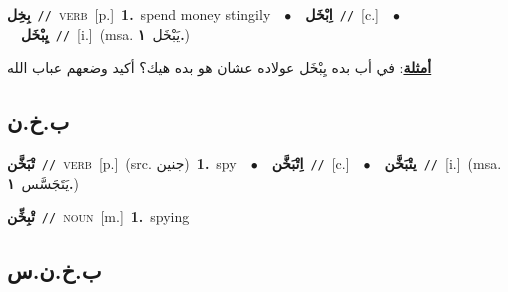 \documentclass[10pt,a4paper,twoside]{article} %
\begin{document}
\begin{multicols}{2}
{\setlength\topsep{0pt}\textbf{\foreignlanguage{arabic}{بِخِل}}\ {\color{gray}\texttt{//}\color{black}}\ \textsc{verb}\ [p.]\ \textbf{1.}~spend money stingily\ \ $\bullet$\ \ \setlength\topsep{0pt}\textbf{\foreignlanguage{arabic}{اِبْخَل}}\ {\color{gray}\texttt{//}\color{black}}\ [c.]\ \ $\bullet$\ \ \setlength\topsep{0pt}\textbf{\foreignlanguage{arabic}{يِبْخَل}}\ {\color{gray}\texttt{//}\color{black}}\ [i.]\ \color{gray}(msa. \foreignlanguage{arabic}{يَبْخَل}~\foreignlanguage{arabic}{\textbf{١.}})\color{black}\  \begin{flushright}\color{gray}\foreignlanguage{arabic}{\textbf{\underline{\foreignlanguage{arabic}{أمثلة}}}: في أب بده يِبْخَل عولاده عشان هو بده هيك؟ أكيد وضعهم عباب الله}\end{flushright}\color{black}} \vspace{2mm}

\vspace{-3mm}
\subsection*{\color{blue}\foreignlanguage{arabic}{ب.خ.ن}\color{blue}{}} 

{\setlength\topsep{0pt}\textbf{\foreignlanguage{arabic}{تْبَخَّن}}\ {\color{gray}\texttt{//}\color{black}}\ \textsc{verb}\ [p.]\ (src. \color{gray}\foreignlanguage{arabic}{جنين}\color{black})\ \textbf{1.}~spy\ \ $\bullet$\ \ \setlength\topsep{0pt}\textbf{\foreignlanguage{arabic}{اِتْبَخَّن}}\ {\color{gray}\texttt{//}\color{black}}\ [c.]\ \ $\bullet$\ \ \setlength\topsep{0pt}\textbf{\foreignlanguage{arabic}{يتْبَخَّن}}\ {\color{gray}\texttt{//}\color{black}}\ [i.]\ \color{gray}(msa. \foreignlanguage{arabic}{يَتَجَسَّس}~\foreignlanguage{arabic}{\textbf{١.}})\color{black}\ } \vspace{2mm}

{\setlength\topsep{0pt}\textbf{\foreignlanguage{arabic}{تْبِخِّن}}\ {\color{gray}\texttt{//}\color{black}}\ \textsc{noun}\ [m.]\ \textbf{1.}~spying\ } \vspace{2mm}

\vspace{-3mm}
\subsection*{\color{blue}\foreignlanguage{arabic}{ب.خ.ن.س}\color{blue}{}} 


\end{multicols}
\end{document}
